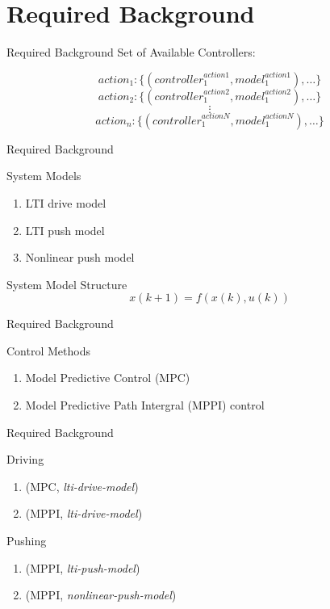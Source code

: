 \section{Required Background}
\begin{frame}[fragile]{Required Background} 
Set of Available Controllers:

\[action_1: \{ (\mathit{controller}_1^\mathit{action1}, \mathit{model}_1^\mathit{action1}), \dots \}\]
\[action_2: \{ (\mathit{controller}_1^\mathit{action2}, \mathit{model}_1^\mathit{action2}), \dots \}\]
\[\vdots\]
\[action_n:  \{ (\mathit{controller}_1^\mathit{actionN}, \mathit{model}_1^\mathit{actionN}), \dots \}\]
\end{frame}


\begin{frame}[fragile]{Required Background} 
\begin{block}{System Models}
\begin{enumerate}
  \item LTI drive model\pause
  \item LTI push model\pause
  \item Nonlinear push model
\end{enumerate}
\end{block}

System Model Structure
  \[x(k+1) = f(x(k), u(k))\]
\end{frame}

\begin{frame}[fragile]{Required Background} 
\begin{block}{Control Methods}
\begin{enumerate}
  \item Model Predictive Control (MPC)
  \item Model Predictive Path Intergral (MPPI) control
\end{enumerate}
\end{block}
\end{frame}


\begin{frame}[fragile]{Required Background} 
\begin{block}{Driving}
\begin{enumerate}
  \item (MPC, \textit{lti-drive-model})
  \item (MPPI, \textit{lti-drive-model})
\end{enumerate}
\end{block}

\begin{block}{Pushing}
\begin{enumerate}
  \item (MPPI, \textit{lti-push-model})
  \item (MPPI, \textit{nonlinear-push-model})
\end{enumerate}
\end{block}
\end{frame}

